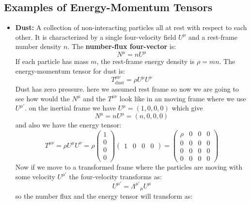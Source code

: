 \documentclass[11pt, a4paper]{report}
\begin{document}
\subsection*{Examples of Energy-Momentum Tensors}

\begin{itemize}
    \item \textbf{Dust:} A collection of non-interacting particles all at rest with respect to each other. It is characterized by a single four-velocity field $U^\mu$ and a rest-frame number density $n$. The \textbf{number-flux four-vector} is:
    \begin{equation}
        N^\mu = nU^\mu
    \end{equation}
    If each particle has mass $m$, the rest-frame energy density is $\rho = mn$. The energy-momentum tensor for dust is:
    \begin{equation}
        T^{\mu\nu}_{\text{dust}} = \rho U^\mu U^\nu
    \end{equation}
    Dust has zero pressure.
    here we assumed rest frame so now we are going to see how would the $N^\mu$ and the $T^{\mu\nu}$ look like in an moving frame where we use $U^{\mu'}$.
    on the inertial frame we have $U^\mu = (1,0,0,0)$ which give 
    $$N^\mu = n U^\mu = (n,0,0,0) $$  
    and also we have the energy tensor: 
    \begin{equation}
    T^{\mu\nu} = \rho U^\mu U^\nu = \rho 
    \begin{pmatrix}
        1 \\
        0 \\
        0 \\
        0 
    \end{pmatrix}
    \begin{pmatrix}
        1 & 0 & 0 & 0
    \end{pmatrix}
    =
    \begin{pmatrix}
    \rho & 0 & 0 & 0 \\
    0 & 0 & 0 & 0 \\
    0 & 0 & 0 & 0 \\
    0 & 0 & 0 & 0
    \end{pmatrix}
    \end{equation}
    Now if we move to a transformed frame where the particles are moving with some velocity $U^{\mu'}$ the four-velocity transforms as:
    \begin{equation}
        U^{\mu'} = {\Lambda^{\mu'}}_\mu U^\mu
    \end{equation}
    so the number flux and the energy tensor will transform as:

\end{itemize}
\end{document}
